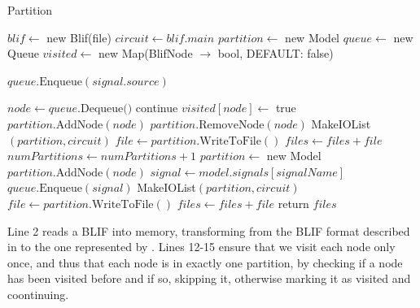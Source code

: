 \documentclass[12pt,final,oneside]{article} %
\begin{document}
\begin{algorithm}
   \caption{Partition}\label{partition}
   \begin{algorithmic}[1]
            \State $blif \gets$ new Blif(file) 
            \State $circuit \gets blif.main$ 
            \State $partition \gets$ new Model 
            \State $queue \gets$ new Queue 
            \State $visited \gets$ new Map(BlifNode $\to$ bool, DEFAULT: false)

               \State $queue.\mbox{Enqueue}(signal.source)$
            \EndFor

               \State $node \gets queue.\mbox{Dequeue()}$
                  \State continue 
               \EndIf
               \State $visited[node] \gets $ true
               \State $partition.\mbox{AddNode}(node)$
                  \State $partition.\mbox{RemoveNode}(node)$
                  \State MakeIOList$(partition, circuit)$
                  \State $file \gets partition.\mbox{WriteToFile}()$
                  \State $files \gets files+file$
                  \State $numPartitions \gets numPartitions+1$
                  \State $partition \gets$ new Model 
                  \State $partition.\mbox{AddNode}(node)$
               \EndIf
                  \State $signal \gets model.signals[signalName]$
                  \State $queue.\mbox{Enqueue}(signal)$
               \EndFor
            \EndWhile
               \State MakeIOList$(partition, circuit)$
               \State $file \gets partition.\mbox{WriteToFile}()$
               \State $files \gets files+file$
            \EndIf
            \State return $files$
         \EndProcedure
   \end{algorithmic}
\end{algorithm}
\FloatBarrier
Line 2 reads a \ac{BLIF} into memory, transforming from the \ac{BLIF} format described in  to the one represented by .
Lines 12-15 ensure that we visit each node only once, and thus that each node is in exactly one partition, by checking if a node has been visited before and if so, skipping it, otherwise marking it as visited and coontinuing.
\end{document}
